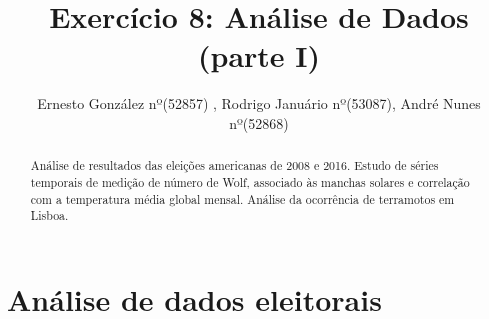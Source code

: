 \documentclass[aps,pre,twocolumn,showpacs,amsmath,amssymb]{revtex4-1}
\begin{document}
\title{Exercício 8: Análise de Dados (parte I)}

\author{Ernesto González nº(52857) , Rodrigo Januário nº(53087), André Nunes nº(52868)}

\begin{abstract}
Análise de resultados das eleições americanas de 2008 e 2016. Estudo de séries temporais de medição de número de Wolf, associado às manchas solares e correlação com a temperatura média global mensal. Análise da ocorrência de terramotos em Lisboa.
\end{abstract}

\maketitle
\section{Análise de dados eleitorais}
\end{document}
